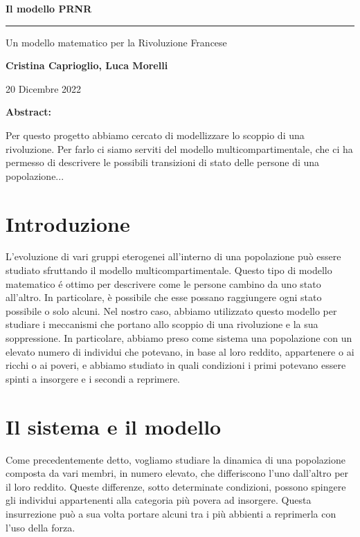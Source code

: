 \begin{center}
	\huge \textbf{Il modello PRNR}
	
	\rule{7cm}{0.4pt} 
	
	\LARGE Un modello matematico per la Rivoluzione Francese
	
	\vspace{20pt}
	
	\LARGE \textbf{Cristina Caprioglio, Luca Morelli}
	
	\vspace{5pt}
	
	\LARGE 20 Dicembre 2022
	
	\vspace{20pt}
 
	\normalsize\textbf{Abstract:}\\
\end{center}
Per questo progetto abbiamo cercato di modellizzare lo scoppio di una rivoluzione. Per farlo ci siamo serviti del modello multicompartimentale, che ci ha permesso di descrivere le possibili transizioni di stato delle persone di una popolazione...

\vspace{20pt}

\section*{Introduzione}
L'evoluzione di vari gruppi eterogenei all'interno di una popolazione può essere studiato sfruttando il modello multicompartimentale. Questo tipo di modello matematico é ottimo per descrivere come le persone cambino da uno stato all'altro. In particolare, è possibile che esse possano raggiungere ogni stato possibile o solo alcuni. Nel nostro caso, abbiamo utilizzato questo modello per studiare i meccanismi che portano allo scoppio di una rivoluzione e la sua soppressione. In particolare, abbiamo preso come sistema una popolazione con un elevato numero di individui che potevano, in base al loro reddito, appartenere o ai ricchi o ai poveri, e abbiamo studiato in quali condizioni i primi potevano essere spinti a insorgere e i secondi a reprimere. 
\section{Il sistema e il modello} \label{sistema modello}
Come precedentemente detto, vogliamo studiare la dinamica di una popolazione composta da vari membri, in numero elevato, che differiscono l'uno dall'altro per il loro reddito. Queste differenze, sotto determinate condizioni, possono spingere gli individui appartenenti alla categoria più povera ad insorgere. Questa insurrezione può a sua volta portare alcuni tra i più abbienti a reprimerla con l'uso della forza.\\


